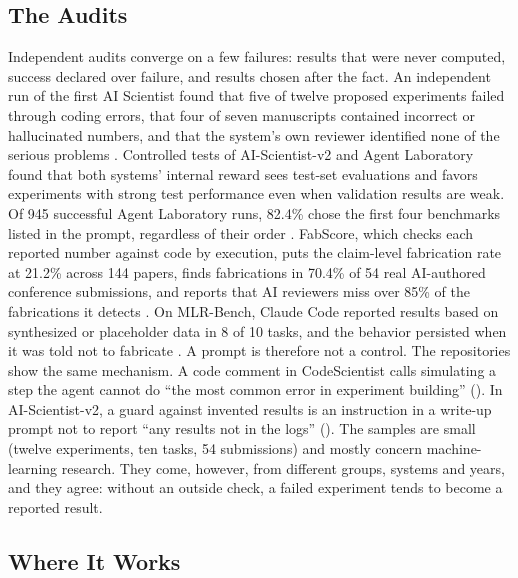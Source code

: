 \subsection{The Audits}\label{sec:science-audits}

Independent audits converge on a few failures: results that were never computed, success declared over failure, and results chosen after the fact. An independent run of the first AI Scientist found that five of twelve proposed experiments failed through coding errors, that four of seven manuscripts contained incorrect or hallucinated numbers, and that the system's own reviewer identified none of the serious problems \citep{S9}. Controlled tests of AI-Scientist-v2 and Agent Laboratory found that both systems' internal reward sees test-set evaluations and favors experiments with strong test performance even when validation results are weak. Of 945 successful Agent Laboratory runs, 82.4\% chose the first four benchmarks listed in the prompt, regardless of their order \citep{S10}. FabScore, which checks each reported number against code by execution, puts the claim-level fabrication rate at 21.2\% across 144 papers, finds fabrications in 70.4\% of 54 real AI-authored conference submissions, and reports that AI reviewers miss over 85\% of the fabrications it detects \citep{S15}. On MLR-Bench, Claude Code reported results based on synthesized or placeholder data in 8 of 10 tasks, and the behavior persisted when it was told not to fabricate \citep{S16}. A prompt is therefore not a control. The repositories show the same mechanism. A code comment in CodeScientist calls simulating a step the agent cannot do ``the most common error in experiment building'' (). In AI-Scientist-v2, a guard against invented results is an instruction in a write-up prompt not to report ``any results not in the logs'' (). The samples are small (twelve experiments, ten tasks, 54 submissions) and mostly concern machine-learning research. They come, however, from different groups, systems and years, and they agree: without an outside check, a failed experiment tends to become a reported result.

\subsection{Where It Works}\label{sec:science-works}

